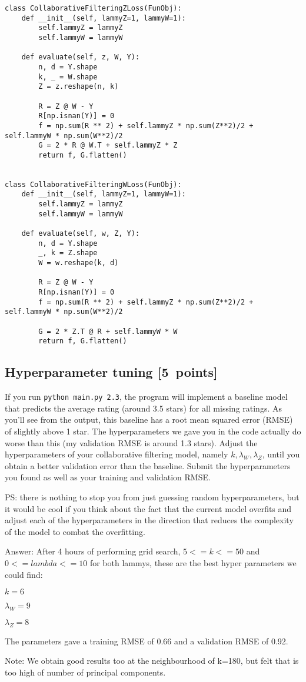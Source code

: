 \documentclass{article}
\newcommand{\blu}[1]{{\textcolor{blu}{#1}}}
\newenvironment{answer}{\par\begingroup\color{gre}Answer: }{\endgroup}
\let\ask\blu
\newcommand\pts[1]{\textcolor{pointscolour}{[#1~points]}}
\begin{document}
\begin{verbatim}
class CollaborativeFilteringZLoss(FunObj):
    def __init__(self, lammyZ=1, lammyW=1):
        self.lammyZ = lammyZ
        self.lammyW = lammyW

    def evaluate(self, z, W, Y):
        n, d = Y.shape
        k, _ = W.shape
        Z = z.reshape(n, k)

        R = Z @ W - Y
        R[np.isnan(Y)] = 0
        f = np.sum(R ** 2) + self.lammyZ * np.sum(Z**2)/2 + self.lammyW * np.sum(W**2)/2
        G = 2 * R @ W.T + self.lammyZ * Z
        return f, G.flatten()


class CollaborativeFilteringWLoss(FunObj):
    def __init__(self, lammyZ=1, lammyW=1):
        self.lammyZ = lammyZ
        self.lammyW = lammyW

    def evaluate(self, w, Z, Y):
        n, d = Y.shape
        _, k = Z.shape
        W = w.reshape(k, d)

        R = Z @ W - Y
        R[np.isnan(Y)] = 0
        f = np.sum(R ** 2) + self.lammyZ * np.sum(Z**2)/2 + self.lammyW * np.sum(W**2)/2
        
        G = 2 * Z.T @ R + self.lammyW * W
        return f, G.flatten()
\end{verbatim}
\newpage

\subsection{Hyperparameter tuning \pts{5}}
If you run \texttt{python main.py 2.3}, the program will implement a baseline model that predicts the average rating (around 3.5 stars) for all missing ratings.
As you'll see from the output, this baseline has a root mean squared error (RMSE) of slightly above 1 star. The hyperparameters we gave you in the code actually do worse than this (my validation RMSE is around 1.3 stars). \ask{Adjust the hyperparameters of your collaborative filtering model, namely $k,\lambda_W,\lambda_Z$, until you obtain a better validation error than the baseline. Submit the hyperparameters you found as well as your training and validation RMSE.}

PS: there is nothing to stop you from just guessing random hyperparameters, but it would be cool if you think about the fact that the current model overfits and adjust each of the hyperparameters in the direction that reduces the complexity of the model to combat the overfitting.
\begin{answer}
After 4 hours of performing grid search, $ 5 <= k <= 50$ and $ 0 <= lambda <= 10 $ for both lammys, these are the best hyper parameters we could find:

$k = 6$

$\lambda_W = 9$

$\lambda_Z = 8$

The parameters gave a training RMSE of 0.66 and a validation RMSE of 0.92.

Note: We obtain good results too at the neighbourhood of k=180, but felt that is too high of number of principal components.

\end{answer}
\newpage
\end{document}
